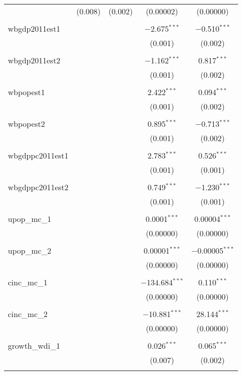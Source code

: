 \begin{table}[!htbp]
\begin{tabular}{@{\extracolsep{5pt}}lcccc}
  & (0.008) & (0.002) & (0.00002) & (0.00000) \\ 
  & & & & \\ 
 wbgdp2011est1 &  &  & $-$2.675$^{***}$ & $-$0.510$^{***}$ \\ 
  &  &  & (0.001) & (0.002) \\ 
  & & & & \\ 
 wbgdp2011est2 &  &  & $-$1.162$^{***}$ & 0.817$^{***}$ \\ 
  &  &  & (0.001) & (0.002) \\ 
  & & & & \\ 
 wbpopest1 &  &  & 2.422$^{***}$ & 0.094$^{***}$ \\ 
  &  &  & (0.001) & (0.002) \\ 
  & & & & \\ 
 wbpopest2 &  &  & 0.895$^{***}$ & $-$0.713$^{***}$ \\ 
  &  &  & (0.001) & (0.002) \\ 
  & & & & \\ 
 wbgdppc2011est1 &  &  & 2.783$^{***}$ & 0.526$^{***}$ \\ 
  &  &  & (0.001) & (0.001) \\ 
  & & & & \\ 
 wbgdppc2011est2 &  &  & 0.749$^{***}$ & $-$1.230$^{***}$ \\ 
  &  &  & (0.001) & (0.001) \\ 
  & & & & \\ 
 upop\_mc\_1 &  &  & 0.0001$^{***}$ & 0.00004$^{***}$ \\ 
  &  &  & (0.00000) & (0.00000) \\ 
  & & & & \\ 
 upop\_mc\_2 &  &  & 0.00001$^{***}$ & $-$0.00005$^{***}$ \\ 
  &  &  & (0.00000) & (0.00000) \\ 
  & & & & \\ 
 cinc\_mc\_1 &  &  & $-$134.684$^{***}$ & 0.110$^{***}$ \\ 
  &  &  & (0.00000) & (0.00000) \\ 
  & & & & \\ 
 cinc\_mc\_2 &  &  & $-$10.881$^{***}$ & 28.144$^{***}$ \\ 
  &  &  & (0.00000) & (0.00000) \\ 
  & & & & \\ 
 growth\_wdi\_1 &  &  & 0.026$^{***}$ & 0.065$^{***}$ \\ 
  &  &  & (0.007) & (0.002) \\ 
  & & & & \\ 

\end{tabular}
\end{table}
